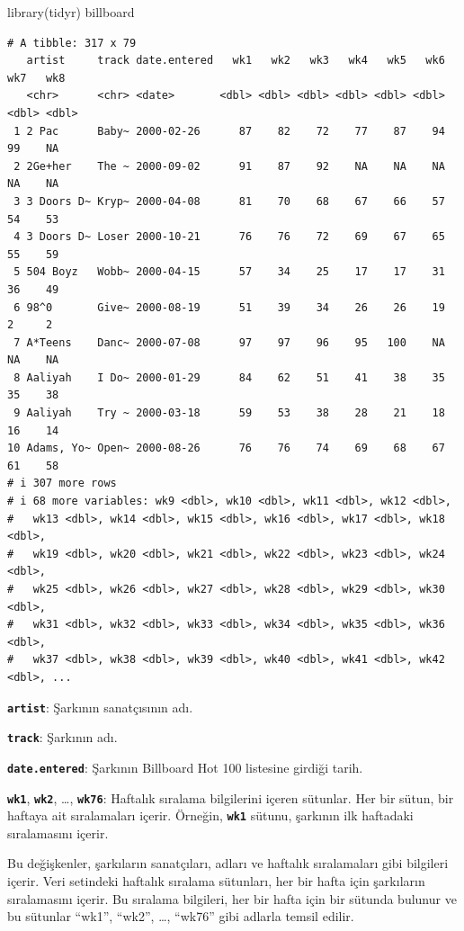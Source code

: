 \documentclass[
  letterpaper,
  DIV=11,
  numbers=noendperiod]{scrreprt}
\newenvironment{Shaded}{\begin{snugshade}}{\end{snugshade}}
\newcommand{\FunctionTok}[1]{\textcolor[rgb]{0.28,0.35,0.67}{#1}}
\newcommand{\NormalTok}[1]{\textcolor[rgb]{0.00,0.23,0.31}{#1}}
\begin{document}
\begin{Shaded}
\begin{Highlighting}[]
\FunctionTok{library}\NormalTok{(tidyr)}
\NormalTok{billboard}
\end{Highlighting}
\end{Shaded}

\begin{verbatim}
# A tibble: 317 x 79
   artist     track date.entered   wk1   wk2   wk3   wk4   wk5   wk6   wk7   wk8
   <chr>      <chr> <date>       <dbl> <dbl> <dbl> <dbl> <dbl> <dbl> <dbl> <dbl>
 1 2 Pac      Baby~ 2000-02-26      87    82    72    77    87    94    99    NA
 2 2Ge+her    The ~ 2000-09-02      91    87    92    NA    NA    NA    NA    NA
 3 3 Doors D~ Kryp~ 2000-04-08      81    70    68    67    66    57    54    53
 4 3 Doors D~ Loser 2000-10-21      76    76    72    69    67    65    55    59
 5 504 Boyz   Wobb~ 2000-04-15      57    34    25    17    17    31    36    49
 6 98^0       Give~ 2000-08-19      51    39    34    26    26    19     2     2
 7 A*Teens    Danc~ 2000-07-08      97    97    96    95   100    NA    NA    NA
 8 Aaliyah    I Do~ 2000-01-29      84    62    51    41    38    35    35    38
 9 Aaliyah    Try ~ 2000-03-18      59    53    38    28    21    18    16    14
10 Adams, Yo~ Open~ 2000-08-26      76    76    74    69    68    67    61    58
# i 307 more rows
# i 68 more variables: wk9 <dbl>, wk10 <dbl>, wk11 <dbl>, wk12 <dbl>,
#   wk13 <dbl>, wk14 <dbl>, wk15 <dbl>, wk16 <dbl>, wk17 <dbl>, wk18 <dbl>,
#   wk19 <dbl>, wk20 <dbl>, wk21 <dbl>, wk22 <dbl>, wk23 <dbl>, wk24 <dbl>,
#   wk25 <dbl>, wk26 <dbl>, wk27 <dbl>, wk28 <dbl>, wk29 <dbl>, wk30 <dbl>,
#   wk31 <dbl>, wk32 <dbl>, wk33 <dbl>, wk34 <dbl>, wk35 <dbl>, wk36 <dbl>,
#   wk37 <dbl>, wk38 <dbl>, wk39 <dbl>, wk40 <dbl>, wk41 <dbl>, wk42 <dbl>, ...
\end{verbatim}

\textbf{\texttt{artist}}: Şarkının sanatçısının adı.

\textbf{\texttt{track}}: Şarkının adı.

\textbf{\texttt{date.entered}}: Şarkının Billboard Hot 100 listesine
girdiği tarih.

\textbf{\texttt{wk1}}, \textbf{\texttt{wk2}}, \ldots,
\textbf{\texttt{wk76}}: Haftalık sıralama bilgilerini içeren sütunlar.
Her bir sütun, bir haftaya ait sıralamaları içerir. Örneğin,
\textbf{\texttt{wk1}} sütunu, şarkının ilk haftadaki sıralamasını
içerir.

Bu değişkenler, şarkıların sanatçıları, adları ve haftalık sıralamaları
gibi bilgileri içerir. Veri setindeki haftalık sıralama sütunları, her
bir hafta için şarkıların sıralamasını içerir. Bu sıralama bilgileri,
her bir hafta için bir sütunda bulunur ve bu sütunlar ``wk1'', ``wk2'',
\ldots, ``wk76'' gibi adlarla temsil edilir.
\end{document}

